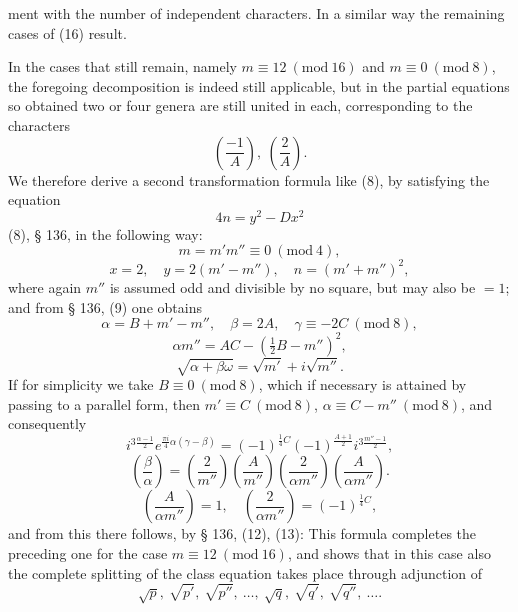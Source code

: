 ment with the number of independent characters. In a similar way the remaining cases of (16) result.

In the cases that still remain, namely $m \equiv 12\ (\mathrm{mod}\ 16)$ and $m \equiv 0\ (\mathrm{mod}\ 8)$, the foregoing decomposition is indeed still applicable, but in the partial equations so obtained two or four genera are still united in each, corresponding to the characters
\[
\left(\frac{-1}{A}\right), \ \left(\frac{2}{A}\right).
\]
We therefore derive a second transformation formula like (8), by satisfying the equation
\[
4n = y^2 - Dx^2
\]
(8), § 136, in the following way:
\[
m = m'm'' \equiv 0\ (\mathrm{mod}\ 4),
\]
\[
x = 2, \quad y = 2(m' - m''), \quad n = (m'+m'')^2,
\]
where again $m''$ is assumed odd and divisible by no square, but may also be $= 1$; and from § 136, (9) one obtains
\[
\alpha = B + m' - m'', \quad \beta = 2A, \quad \gamma \equiv -2C\ (\mathrm{mod}\ 8),
\]
\[
\alpha m'' = AC - \left(\tfrac12 B - m''\right)^2,
\]
\[
\sqrt{\alpha + \beta\omega} = \sqrt{m'} + i\sqrt{m''}.
\]
If for simplicity we take $B \equiv 0\ (\mathrm{mod}\ 8)$, which if necessary is attained by passing to a parallel form, then $m' \equiv C\ (\mathrm{mod}\ 8)$, $\alpha \equiv C - m''\ (\mathrm{mod}\ 8)$, and consequently
\[
i^{3\frac{\alpha-1}{2}} e^{\frac{\pi i}{4}\alpha(\gamma-\beta)} = (-1)^{\frac14 C} (-1)^{\frac{A+1}{2}} i^{3\frac{m''-1}{2}},
\]
\[
\left(\frac{\beta}{\alpha}\right) = \left(\frac{2}{m''}\right)\left(\frac{A}{m''}\right)\left(\frac{2}{\alpha m''}\right)\left(\frac{A}{\alpha m''}\right).
\]
\[
\left(\frac{A}{\alpha m''}\right) = 1, \quad \left(\frac{2}{\alpha m''}\right) = (-1)^{\frac14 C},
\]
and from this there follows, by § 136, (12), (13):
This formula completes the preceding one for the case $m \equiv 12\ (\mathrm{mod}\ 16)$, and shows that in this case also the complete splitting of the class equation takes place through adjunction of
\[
\sqrt{p}, \ \sqrt{p'}, \ \sqrt{p''}, \ \ldots, \ \sqrt{q}, \ \sqrt{q'}, \ \sqrt{q''}, \ \ldots.
\]
